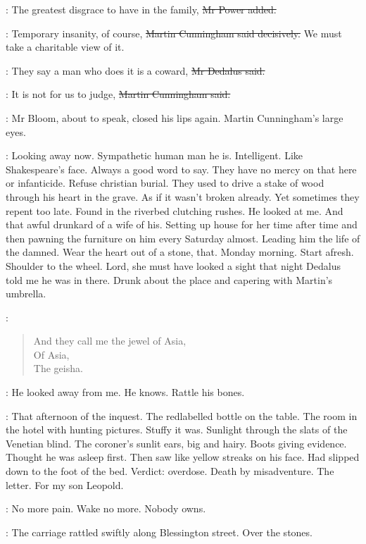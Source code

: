 \power:
The greatest disgrace to have in the family,
\sout{Mr Power added.}

\cunningham:
Temporary insanity, of course,
\sout{Martin Cunningham said decisively.}
We must take
a charitable view of it.

\simon:
They say a man who does it is a coward,
\sout{Mr Dedalus said.}

\cunningham:
It is not for us to judge,
\sout{Martin Cunningham said.}

:
Mr Bloom, about to speak, closed his lips again.
Martin Cunningham's large eyes.

\BloomInt:
Looking away now.
Sympathetic human man he is.
Intelligent.
Like Shakespeare's face.
Always a good word to say.
They have no mercy on that here or infanticide.
Refuse christian burial.
They used to drive a stake of wood through his heart in the grave.
As if it wasn't broken already.
Yet sometimes they repent too late.
Found in the riverbed clutching rushes.
He looked at me.
And that awful drunkard of a wife of his.
Setting up house for her time after time
and then pawning the furniture on him every Saturday almost.
Leading him the life of the damned.
Wear the heart out of a stone, that.
Monday morning.
Start afresh.
Shoulder to the wheel.
Lord, she must have looked a sight that night Dedalus told me he was in there.
Drunk about the place and capering with Martin's umbrella.

\BloomInt:
\begin{verse}
    And they call me the jewel of Asia, \\
    Of Asia, \\
    The geisha.
\end{verse}

\BloomInt:
He looked away from me.
He knows.
Rattle his bones.

\BloomInt:
That afternoon of the inquest.
The redlabelled bottle on the table.
The room in the hotel with hunting pictures.
Stuffy it was.
Sunlight through the slats of the Venetian blind.
The coroner's sunlit ears, big and hairy.
Boots giving evidence.
Thought he was asleep first.
Then saw like yellow streaks on his face.
Had slipped down to the foot of the bed.
Verdict:
overdose.
Death by misadventure.
The letter.
For my son Leopold.

\BloomInt:
No more pain.
Wake no more.
Nobody owns.

:
The carriage rattled swiftly along Blessington street.
Over the stones.

